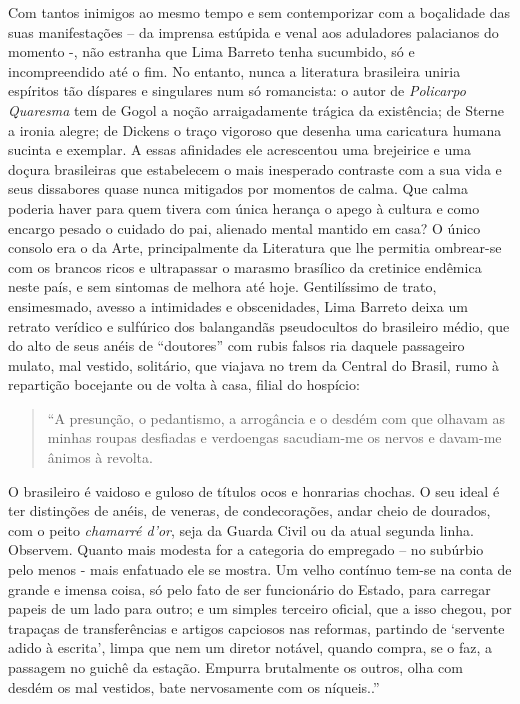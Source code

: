 \documentclass[
  letterpaper,
  DIV=11,
  numbers=noendperiod]{scrreprt}
\begin{document}
Com tantos inimigos ao mesmo tempo e sem contemporizar com a boçalidade
das suas manifestações -- da imprensa estúpida e venal aos aduladores
palacianos do momento -, não estranha que Lima Barreto tenha sucumbido,
só e incompreendido até o fim. No entanto, nunca a literatura brasileira
uniria espíritos tão díspares e singulares num só romancista: o autor de
\emph{Policarpo Quaresma} tem de Gogol a noção arraigadamente trágica da
existência; de Sterne a ironia alegre; de Dickens o traço vigoroso que
desenha uma caricatura humana sucinta e exemplar. A essas afinidades ele
acrescentou uma brejeirice e uma doçura brasileiras que estabelecem o
mais inesperado contraste com a sua vida e seus dissabores quase nunca
mitigados por momentos de calma. Que calma poderia haver para quem
tivera com única herança o apego à cultura e como encargo pesado o
cuidado do pai, alienado mental mantido em casa? O único consolo era o
da Arte, principalmente da Literatura que lhe permitia ombrear-se com os
brancos ricos e ultrapassar o marasmo brasílico da cretinice endêmica
neste país, e sem sintomas de melhora até hoje. Gentilíssimo de trato,
ensimesmado, avesso a intimidades e obscenidades, Lima Barreto deixa um
retrato verídico e sulfúrico dos balangandãs pseudocultos do brasileiro
médio, que do alto de seus anéis de ``doutores'' com rubis falsos ria
daquele passageiro mulato, mal vestido, solitário, que viajava no trem
da Central do Brasil, rumo à repartição bocejante ou de volta à casa,
filial do hospício:

\begin{quote}
``A presunção, o pedantismo, a arrogância e o desdém com que olhavam as
minhas roupas desfiadas e verdoengas sacudiam-me os nervos e davam-me
ânimos à revolta.
\end{quote}

O brasileiro é vaidoso e guloso de títulos ocos e honrarias chochas. O
seu ideal é ter distinções de anéis, de veneras, de condecorações, andar
cheio de dourados, com o peito \emph{chamarré d'or}, seja da Guarda
Civil ou da atual segunda linha. Observem. Quanto mais modesta for a
categoria do empregado -- no subúrbio pelo menos - mais enfatuado ele se
mostra. Um velho contínuo tem-se na conta de grande e imensa coisa, só
pelo fato de ser funcionário do Estado, para carregar papeis de um lado
para outro; e um simples terceiro oficial, que a isso chegou, por
trapaças de transferências e artigos capciosos nas reformas, partindo de
`servente adido à escrita', limpa que nem um diretor notável, quando
compra, se o faz, a passagem no guichê da estação. Empurra brutalmente
os outros, olha com desdém os mal vestidos, bate nervosamente com os
níqueis..''
\end{document}
